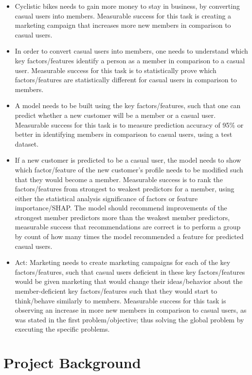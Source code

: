 \documentclass[11pt, onecolumn]{article}
\begin{document}
\begin{itemize}
\item Cyclistic bikes needs to gain more money to stay in business, by converting casual users into members. Measurable success for this task is creating a marketing campaign that increases more new members in comparison to casual users.
\item In order to convert casual users into members, one needs to understand which key factors/features identify a person as a member in comparison to a casual user. Measurable success for this task is to statistically prove which factors/features are statistically different for casual users in comparison to members.
\item A model needs to be built using the key factors/features, such that one can predict whether a new customer will be a member or a casual user. Measurable success for this task is to measure prediction accuracy of 95\% or better in identifying members in comparison to casual users, using a test dataset.
\item If a new customer is predicted to be a casual user, the model needs to show which factor/feature of the new customer's profile needs to be modified such that they would become a member. Measurable success is to rank the factors/features from strongest to weakest predictors for a member, using either the statistical analysis significance of factors or feature importance/SHAP. The model should recommend improvements of the strongest member predictors more than the weakest member predictors, measurable success that recommendations are correct is to perform a group by count of how many times the model recommended a feature for predicted casual users.
\item Act: Marketing needs to create marketing campaigns for each of the key factors/features, such that casual users deficient in these key factors/features would be given marketing that would change their ideas/behavior about the member-deficient key factors/features such that they would start to think/behave similarly to members. Measurable success for this task is observing an increase in more new members in comparison to casual users, as was stated in the first problem/objective; thus solving the global problem by executing the specific problems.
\end{itemize}


\section{Project Background}
\end{document}
